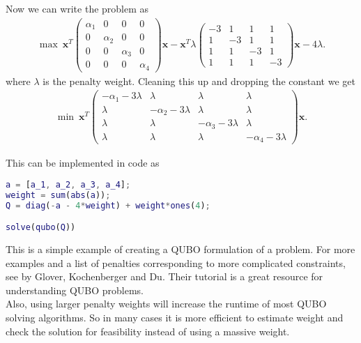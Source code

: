 \documentclass{article}
\begin{document}
\noindent Now we can write the problem as
\begin{align*}
	\max \: \mathbf{x}^T\begin{pmatrix}
		\alpha_1 & 0 & 0 & 0 \\
		0 & \alpha_2 & 0 & 0 \\
		0 & 0 & \alpha_3 & 0 \\ 
		0 & 0 & 0 & \alpha_4
	\end{pmatrix}\mathbf{x} - \mathbf{x}^T \lambda\begin{pmatrix}
	-3 & 1 & 1 & 1 \\
	1 & -3 & 1 & 1 \\
	1 & 1 & -3 & 1 \\
	1 & 1 & 1 & -3
	\end{pmatrix} \mathbf{x} - 4\lambda.
\end{align*}
where \(\lambda\) is the penalty weight. Cleaning this up and dropping the constant we get
\begin{align*}
	\min \: \mathbf{x}^T \begin{pmatrix}
		-\alpha_1 - 3\lambda & \lambda & \lambda & \lambda \\
		\lambda & -\alpha_2 - 3\lambda & \lambda & \lambda \\
		\lambda & \lambda & -\alpha_3 - 3\lambda & \lambda \\
		\lambda & \lambda & \lambda & -\alpha_4 - 3\lambda
	\end{pmatrix} \mathbf{x}.
\end{align*}

\newpage 

\noindent This can be implemented in code as
\begin{lstlisting}[language=MATLAB]
a = [a_1, a_2, a_3, a_4];
weight = sum(abs(a));
Q = diag(-a - 4*weight) + weight*ones(4);

solve(qubo(Q))
\end{lstlisting}
\noindent This is a simple example of creating a QUBO formulation of a problem. For more examples and a list of penalties corresponding to more complicated constraints, see \cite[p.~10]{tutorialQUBO} by Glover, Kochenberger and Du. Their tutorial is a great resource for understanding QUBO problems.\\

\noindent Also, using larger penalty weights will increase the runtime of most QUBO solving algorithms. So in many cases it is more efficient to estimate weight and check the solution for feasibility instead of using a massive weight.     
\end{document}
